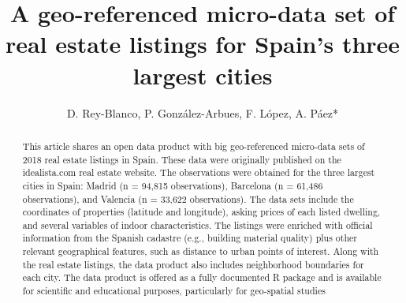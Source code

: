 \documentclass[Royal,times,sageh]{sagej}
\begin{document}

\title{A geo-referenced micro-data set of real estate listings for
Spain's three largest cities}


\author{D. Rey-Blanco, P. González-Arbues, F.
López, A. Páez*}




\begin{abstract}
This article shares an open data product with big geo-referenced
micro-data sets of 2018 real estate listings in Spain. These data were
originally published on the idealista.com real estate website. The
observations were obtained for the three largest cities in Spain: Madrid
(n = 94,815 observations), Barcelona (n = 61,486 observations), and
Valencia (n = 33,622 observations). The data sets include the
coordinates of properties (latitude and longitude), asking prices of
each listed dwelling, and several variables of indoor characteristics.
The listings were enriched with official information from the Spanish
cadastre (e.g., building material quality) plus other relevant
geographical features, such as distance to urban points of interest.
Along with the real estate listings, the data product also includes
neighborhood boundaries for each city. The data product is offered as a
fully documented R package and is available for scientific and
educational purposes, particularly for geo-spatial studies
\end{abstract}


\maketitle
\end{document}
